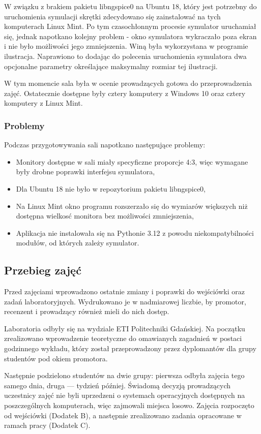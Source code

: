 W związku z brakiem pakietu libngspice0 na Ubuntu 18, który jest potrzebny do uruchomienia symulacji skrętki zdecydowano się zainstalować na tych komputerach Linux Mint. Po tym czasochłonnym procesie symulator uruchamiał się, jednak napotkano kolejny problem - okno symulatora wykraczało poza ekran i nie było możliwości jego zmniejszenia. Winą była wykorzystana w programie ilustracja. Naprawiono to dodając do polecenia uruchomienia symulatora dwa opcjonalne parametry określające maksymalny
rozmiar tej ilustracji.

W tym momencie sala była w ocenie prowadzących gotowa do przeprowadzenia zajęć. Ostatecznie dostępne były cztery komputery z Windows 10 oraz cztery komputery z Linux Mint.

\subsubsection{Problemy}
Podczas przygotowywania sali napotkano następujące problemy:
\begin{itemize}
    \item Monitory dostępne w sali miały specyficzne proporcje 4:3, więc wymagane były drobne poprawki interfejsu symulatora,
    \item Dla Ubuntu 18 nie było w repozytorium pakietu libngspice0,
    \item Na Linux Mint okno programu rozszerzało się do wymiarów większych niż dostępna wielkosć monitora bez możliwości zmniejszenia,
    \item Aplikacja nie instalowała się na Pythonie 3.12 z powodu niekompatybilności
    modułów, od których zależy symulator.
\end{itemize}

\subsection{Przebieg zajęć}

Przed zajęciami wprowadzono ostatnie zmiany i poprawki do wejściówki oraz zadań laboratoryjnych. Wydrukowano je w nadmiarowej liczbie, by promotor, recenzent i prowadzący również mieli do nich dostęp.

Laboratoria odbyły się na wydziale ETI Politechniki Gdańskiej. Na początku zrealizowano wprowadzenie teoretyczne do omawianych zagadnień w postaci godzinnego
wykładu, który został przeprowadzony przez dyplomantów dla grupy studentów pod okiem promotora.

Następnie podzielono studentów na dwie grupy: pierwsza odbyła zajęcia tego samego dnia, druga --- tydzień później. Świadomą decyzją prowadzących uczestnicy zajęć nie byli uprzedzeni o systemach operacyjnych dostępnych na poszczególnych komputerach, więc zajmowali miejsca losowo. Zajęcia rozpoczęto od wejściówki (Dodatek B), a następnie zrealizowano zadania opracowane w ramach pracy (Dodatek C).

